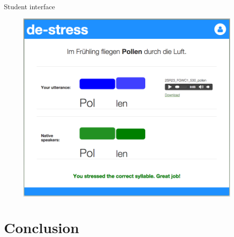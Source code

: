 \documentclass[xcolor={dvipsnames}]{beamer}
\begin{document}
		\begin{frame}{Student interface}
		\begin{figure}
		\includegraphics[height=.85\textheight]{../img/screenshots/StudentInterface-userIcon}
		\end{figure}
		\end{frame}
		
\section{Conclusion}
{ 
}
\end{document}
